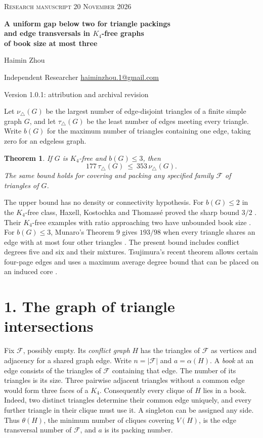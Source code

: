 \documentclass[11pt,a4paper]{article}
\newtheorem{theorem}{Theorem}
\newcommand{\F}{\mathcal F}
\begin{document}
{\small\scshape Research manuscript \hfill 20 November 2026}
\medskip

{\LARGE\bfseries A uniform gap below two for triangle packings\\[-1pt]
and edge transversals in \(K_4\)-free graphs\\[-1pt]
of book size at most three\par}
\medskip

{\large Haimin Zhou\par}
{\small Independent Researcher \quad
\href{mailto:haiminzhou.1@gmail.com}{haiminzhou.1@gmail.com}\par}
{\small Version 1.0.1: attribution and archival revision\par}
\medskip

Let \(\nu_\triangle(G)\) be the largest number of edge-disjoint triangles of
a finite simple graph \(G\), and let \(\tau_\triangle(G)\) be the least
number of edges meeting every triangle. Write \(b(G)\) for the maximum
number of triangles containing one edge, taking zero for an edgeless graph.

\begin{theorem}\label{thm:main}
If \(G\) is \(K_4\)-free and \(b(G)\le3\), then
\[
              177\,\tau_\triangle(G)\ \le\ 353\,\nu_\triangle(G).
\]
The same bound holds for covering and packing any specified family
\(\F\) of triangles of \(G\).
\end{theorem}

The upper bound has no density or connectivity hypothesis. For \(b(G)\le2\)
in the \(K_4\)-free class, Haxell, Kostochka and Thomassé
proved the sharp bound \(3/2\) \cite{hktflat}. Their \(K_4\)-free examples
with ratio approaching two have unbounded book size \cite{hktfrac}.
For \(b(G)\le3\), Munaro's Theorem 9 gives \(193/98\) when every triangle
shares an edge with at most four other triangles \cite{munaro}.
The present bound includes conflict degrees five and six and their mixtures.
Tsujimura's recent theorem allows certain four-page edges and uses a maximum
average degree bound that can be placed on an induced core \cite{tsu}.

\section*{1. The graph of triangle intersections}

Fix \(\F\), possibly empty. Its \emph{conflict graph} \(H\) has the triangles
of \(\F\) as vertices and adjacency for a shared graph edge. Write \(n=|\F|\)
and \(a=\alpha(H)\). A \emph{book} at an edge consists of the triangles of
\(\F\) containing that edge. The number of its triangles is its size. Three
pairwise adjacent triangles without a common edge would form three faces of
a \(K_4\). Consequently every clique of \(H\) lies in a book. Indeed, two
distinct triangles determine their common edge uniquely, and every further
triangle in their clique must use it. A singleton can be assigned any side.
Thus \(\theta(H)\), the minimum number of cliques covering \(V(H)\), is the
edge transversal number of \(\F\), and \(a\) is its packing number.
\end{document}
